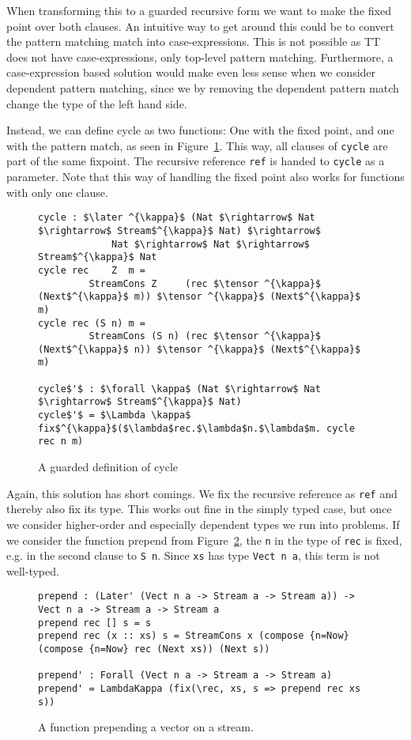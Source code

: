 When transforming this to a guarded recursive form we want to make the fixed
point over both clauses. An intuitive way to get around this could be to
convert the pattern matching match into case-expressions. This is not possible
as TT does not have case-expressions, only top-level pattern
matching. Furthermore, a case-expression based solution would make even less
sense when we consider dependent pattern matching, since we by removing the
dependent pattern match change the type of the left hand side.

Instead, we can define cycle as two functions: One with the fixed point, and one
with the pattern match, as seen in Figure~\ref{fig:cycle_guarded}. This way, all
clauses of \texttt{cycle} are part of the same fixpoint. The recursive reference
\texttt{ref} is handed to \texttt{cycle} as a parameter. Note that this way of
handling the fixed point also works for functions with only one clause.

\begin{figure}[h]
\begin{lstlisting}[mathescape]
cycle : $\later ^{\kappa}$ (Nat $\rightarrow$ Nat $\rightarrow$ Stream$^{\kappa}$ Nat) $\rightarrow$ 
             Nat $\rightarrow$ Nat $\rightarrow$ Stream$^{\kappa}$ Nat
cycle rec    Z  m = 
         StreamCons Z     (rec $\tensor ^{\kappa}$ (Next$^{\kappa}$ m)) $\tensor ^{\kappa}$ (Next$^{\kappa}$ m)
cycle rec (S n) m = 
         StreamCons (S n) (rec $\tensor ^{\kappa}$ (Next$^{\kappa}$ n)) $\tensor ^{\kappa}$ (Next$^{\kappa}$ m)

cycle$'$ : $\forall \kappa$ (Nat $\rightarrow$ Nat $\rightarrow$ Stream$^{\kappa}$ Nat)
cycle$'$ = $\Lambda \kappa$ fix$^{\kappa}$($\lambda$rec.$\lambda$n.$\lambda$m. cycle rec n m)
\end{lstlisting}
  \caption{A guarded definition of cycle}
  \label{fig:cycle_guarded}
\end{figure}

Again, this solution has short comings. We fix the recursive
reference as \texttt{ref} and thereby also fix its type. This works out fine in
the simply typed case, but once we consider higher-order and especially
dependent types we run into problems. If we consider the function prepend from
Figure~\ref{fig:guarded_prepend}, the \texttt{n} in the type of \texttt{rec} is
fixed, e.g. in the second clause to \texttt{S n}. Since \texttt{xs} has type
\texttt{Vect n a}, this term is not well-typed.

\begin{figure}[h]
\begin{lstlisting}[mathescape]
prepend : (Later' (Vect n a -> Stream a -> Stream a)) -> Vect n a -> Stream a -> Stream a
prepend rec [] s = s 
prepend rec (x :: xs) s = StreamCons x (compose {n=Now} (compose {n=Now} rec (Next xs)) (Next s))

prepend' : Forall (Vect n a -> Stream a -> Stream a)
prepend' = LambdaKappa (fix(\rec, xs, s => prepend rec xs s))
\end{lstlisting}
  \caption{A function prepending a vector on a stream.}
  \label{fig:guarded_prepend}
\end{figure}

